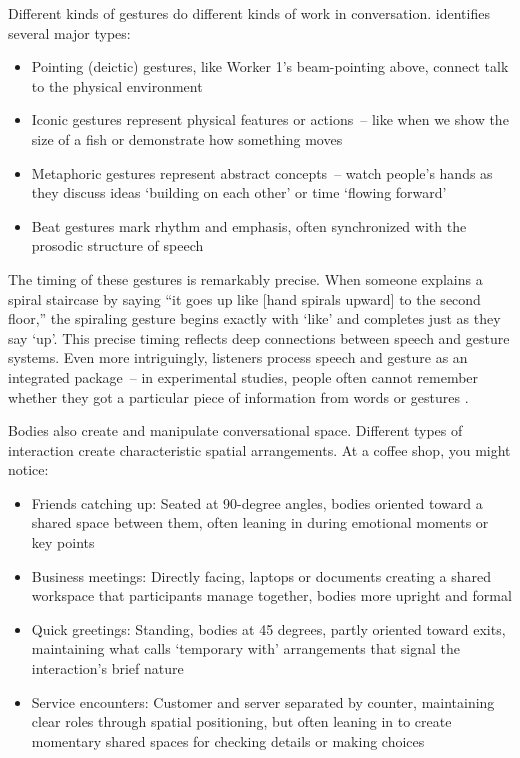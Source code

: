 Different kinds of gestures do different kinds of work in conversation. \citet{mcneill1992} identifies several major types:
\begin{itemize}[noitemsep]
  \item Pointing (deictic) gestures, like Worker 1's beam-pointing above, connect talk to the physical environment
  \item Iconic gestures represent physical features or actions~-- like when we show the size of a fish or demonstrate how something moves
  \item Metaphoric gestures represent abstract concepts~-- watch people's hands as they discuss ideas `building on each other' or time `flowing forward'
  \item Beat gestures mark rhythm and emphasis, often synchronized with the prosodic structure of speech
\end{itemize}
The timing of these gestures is remarkably precise. When someone explains a spiral staircase by saying ``it goes up like [hand spirals upward] to the second floor,'' the spiraling gesture begins exactly with `like' and completes just as they say `up'. This precise timing reflects deep connections between speech and gesture systems. Even more intriguingly, listeners process speech and gesture as an integrated package~-- in experimental studies, people often cannot remember whether they got a particular piece of information from words or gestures \citep{gurney2013}.

Bodies also create and manipulate conversational space. Different types of interaction create characteristic spatial arrangements. At a coffee shop, you might notice:
\begin{itemize}[noitemsep]
  \item Friends catching up: Seated at 90-degree angles, bodies oriented toward a shared space between them, often leaning in during emotional moments or key points
  \item Business meetings: Directly facing, laptops or documents creating a shared workspace that participants manage together, bodies more upright and formal
  \item Quick greetings: Standing, bodies at 45 degrees, partly oriented toward exits, maintaining what \citet{kendon1990} calls `temporary with' arrangements that signal the interaction's brief nature
  \item Service encounters: Customer and server separated by counter, maintaining clear roles through spatial positioning, but often leaning in to create momentary shared spaces for checking details or making choices
\end{itemize}

